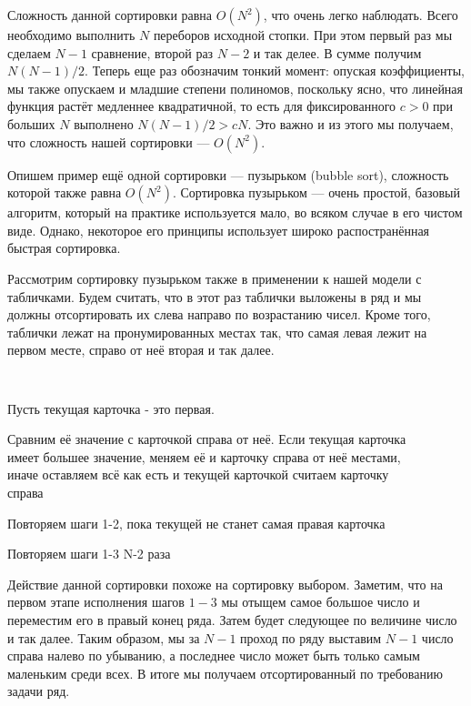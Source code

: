 Сложность данной сортировки равна $O(N^2)$, что очень легко наблюдать. 
Всего необходимо выполнить $N$ переборов исходной стопки. При этом первый раз 
мы сделаем $N-1$ сравнение, второй раз $N-2$ и так делее. В сумме получим
$N(N-1)/2$. Теперь еще раз обозначим тонкий момент: опуская коэффициенты, мы 
также опускаем и младшие степени полиномов, поскольку ясно, что линейная 
функция растёт медленнее квадратичной, то есть для фиксированного $c > 0$ при
больших $N$ выполнено $N(N-1)/2 > cN$. Это важно и из этого мы получаем, что
сложность нашей сортировки --- $O(N^2)$.

Опишем пример ещё одной сортировки --- пузырьком (bubble sort), сложность которой
также равна $O(N^2)$. Сортировка пузырьком --- очень простой, базовый алгоритм,
который на практике используется мало, во всяком случае в его чистом виде.
Однако, некоторое его принципы использует широко распостранённая быстрая сортировка.

Рассмотрим сортировку пузырьком также в применении к нашей модели с табличками.
Будем считать, что в этот раз таблички выложены в ряд и мы должны отсортировать их 
слева направо по возрастанию чисел. Кроме того, таблички лежат на пронумированных 
местах так, что самая левая лежит на первом месте, справо от неё вторая и так далее.

\begin{enumerate}
    {\tt
    \item Пусть текущая карточка - это первая.
    \item Сравним её значение с карточкой справа от неё. Если текущая карточка \\ 
        имеет большее значение, меняем её и карточку справа от неё местами, \\ иначе 
        оставляем всё как есть и текущей карточкой считаем карточку \\ справа
    \item Повторяем шаги 1-2, пока текущей не станет самая правая карточка
    \item Повторяем шаги 1-3 N-2 раза
    }
\end{enumerate}

\smallskip

Действие данной сортировки похоже на сортировку выбором. Заметим, что на первом 
этапе исполнения шагов $1-3$ мы отыщем самое большое число и переместим его в правый
конец ряда. Затем будет следующее по величине число и так далее. Таким образом, мы за
$N-1$ проход по ряду выставим $N-1$ число справа налево по убыванию, а последнее 
число может быть только самым маленьким среди всех. В итоге мы получаем отсортированный
по требованию задачи ряд.

